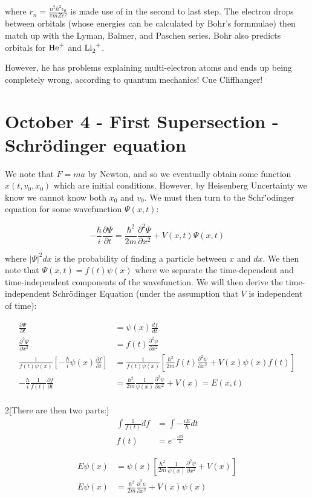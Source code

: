 \documentclass{report}
\begin{document}
where $r_n = \frac{n^2h^2\epsilon_0}{\pi m Z e^2}$ is made use of in the second to last step. The electron drops between orbitals (whose energies can be calculated by Bohr's formmulae) then match up with the Lyman, Balmer, and Paschen series. Bohr also predicts orbitals for $\ce{He+}$ and $\ce{Li2+}$.

However, he has problems explaining multi-electron atoms and ends up being completely wrong, according to quantum mechanics! Cue Cliffhanger!

\chapter{October 4 - First Supersection - Schr\"odinger equation}

We note that $F = ma$ by Newton, and so we eventually obtain some function $x(t,v_0,x_0)$ which are initial conditions. However, by Heisenberg Uncertainty we know we cannot know both $x_0$ and $v_0$. We must then turn to the Schr\"'odinger equation for some wavefunction $\Psi(x,t)$:

$$-\frac{\hbar}{i}\frac{\partial \Psi}{\partial t} = \frac{\hbar^2}{2m}\frac{\partial^2 \Psi}{\partial x^2} + V(x,t)\Psi(x,t)$$

where $|\Psi|^2 dx$ is the probability of finding a particle between $x$ and $dx$. We then note that $\Psi(x,t) = f(t)\psi(x)$ where we separate the time-dependent and time-independent components of the wavefunction. We will then derive the time-independent Schr\"odinger Equation (under the assumption that $V$ is independent of time):

\begin{align*}
\frac{\partial \Psi}{\partial t} &= \psi(x) \frac{df}{dt}\\
\frac{\partial^2 \Psi}{\partial x^2} &= f(t) \frac{\partial^2 \psi}{\partial x^2}\\
\frac{1}{f(t) \psi(x)} \left[-\frac{\hbar}{i} \psi(x) \frac{\partial f}{\partial t}\right] &= \frac{1}{f(t) \psi(x)} \left[\frac{\hbar^2}{2m}f(t)\frac{\partial^2 \psi}{\partial x^2} + V(x)\psi(x)f(t)\right]\\
-\frac{\hbar}{i} \frac{1}{f(t)} \frac{\partial f}{\partial t} &= \frac{\hbar^2}{2m} \frac{1}{\psi(x)}\frac{\partial^2 \psi}{\partial x^2} + V(x) = E(x,t)\\
\end{align*}

\begin{paracol}{2}[There are then two parts:]
\begin{align*}
\displaystyle\int \frac{1}{f(t)} df  &= \displaystyle\int -\frac{iE}{\hbar} dt\\
f(t) &= e^{-\frac{iEt}{h}}
\end{align*}

\switchcolumn

\begin{align*}
E\psi(x) &= \psi(x)\left[\frac{\hbar^2}{2m} \frac{1}{\psi(x)}\frac{\partial^2 \psi}{\partial x^2} + V(x)\right]\\
E \psi(x) &= \frac{\hbar^2}{2m} \frac{\partial^2 \psi}{\partial x^2} + V(x) \psi(x)
\end{align*}
\end{paracol}
\end{document}
